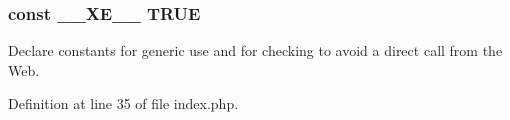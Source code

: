 \subsubsection[{\texorpdfstring{\+\_\+\+\_\+\+X\+E\+\_\+\+\_\+}{__XE__}}]{\setlength{\rightskip}{0pt plus 5cm}const \+\_\+\+\_\+\+X\+E\+\_\+\+\_\+ T\+R\+UE}\hypertarget{index_8php_a697de427d83b791899ae45d555377756}{}\label{index_8php_a697de427d83b791899ae45d555377756}


Declare constants for generic use and for checking to avoid a direct call from the Web. 



Definition at line 35 of file index.\+php.

